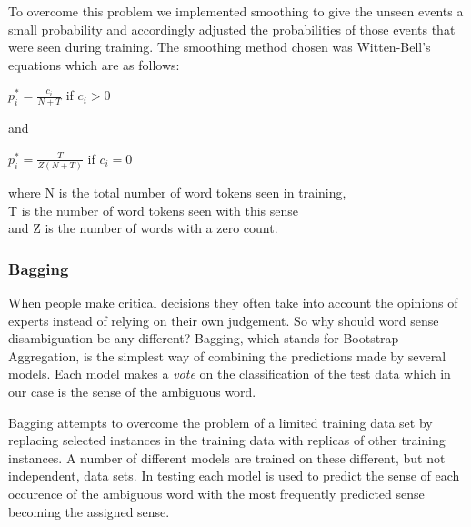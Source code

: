 \documentclass[a4wide,10pt]{article}
\begin{document}
        To overcome this problem we implemented smoothing
        to give the unseen events a small probability and accordingly 
	adjusted the
        probabilities of those events that were seen during training.
        The smoothing method chosen was Witten-Bell's equations which are
        as follows:\\
        \begin{center}
        $p_i^* = \frac{c_i} {N + T} $ if $c_i > 0$\\
        \vspace{0.5cm}

        and\\
        \vspace{0.5cm}

        $p_i^* = \frac{T}{Z(N + T)} $ if $c_i = 0$\\

        \vspace{0.5cm}
        \end{center}
        where N is the total number of word tokens seen in training,\\
        T is the number of word tokens seen with this sense\\
        and Z is the number of words with a zero count.


        \subsubsection{Bagging}
        When people make critical decisions they often take into account the
        opinions of experts instead of relying on their own judgement.
        So why should word sense disambiguation be any different?
        Bagging, which stands for Bootstrap Aggregation, is the simplest way
        of combining the predictions made by several models.  Each model makes
        a {\it vote} on the classification of the test data which in
        our case is the sense of the ambiguous word.


        Bagging attempts to overcome the problem of a limited training data
        set by replacing selected instances in the training data with replicas
        of other training instances.
        A number of different models are trained on these different, but
        not independent, data sets.  In testing each model is used to
        predict the sense of each occurence of the ambiguous word with
        the most frequently
        predicted sense becoming the assigned sense.
\end{document}
